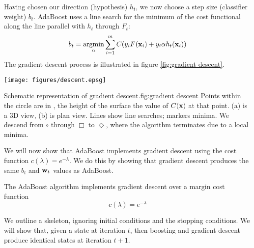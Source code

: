 Having chosen our direction (hypothesis) $h_t$, we now choose a step
size (classifier weight) $b_t$.  AdaBoost uses a line search for the
minimum of the cost functional along the line parallel with $h_t$
through $F_t$:
%
\begin{equation}
b_t = \argmin_{\alpha} \sum_{i=1}^{m} C(y_i F(\bfx_i) + y_i \alpha
h_t(\bfx_i))
\end{equation}
%
The gradient descent process is illustrated in figure
\ref{fig:gradient descent}.

\begin{linefigure}
\begin{center}
\texttt{[image: figures/descent.epsg]}
\end{center}
\begin{capt}{Schematic representation of gradient
descent.}{fig:gradient descent}
Points within the circle are in \calH, the height of the surface
the value of $C(\mathbf{x})$ at that point.  (a) is a 3D view, (b) is plan
view. Lines show line searches; markers minima.  We descend from
$\circ$ through $\Box$ to $\Diamond$, where the algorithm terminates
due to a local minima.
\end{capt}
\end{linefigure}

We will now show that AdaBoost implements gradient descent using the
cost function $c(\lambda) = e^{-\lambda}$.  We do this by showing that
gradient descent produces the same $b_t$ and $\mathbf{w}_t$ values as
AdaBoost.

\begin{theorem}
The AdaBoost algorithm implements gradient descent over a margin cost
function
%
\begin{equation}
c(\lambda) = e^{-\lambda}
\end{equation}
\end{theorem}

\proof We outline a skeleton, ignoring initial conditions and the
stopping conditions.  We will show that, given a state at iteration
$t$, then boosting and gradient descent produce identical states at
iteration $t+1$.

